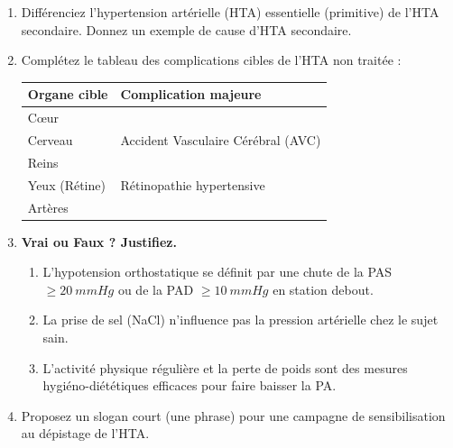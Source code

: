 \documentclass[11pt]{article}
\begin{document}
\begin{exercice}
\begin{enumerate}
\item Différenciez l'hypertension artérielle (HTA) essentielle (primitive) de l'HTA secondaire. Donnez un exemple de cause d'HTA secondaire.
\item Complétez le tableau des complications cibles de l'HTA non traitée :
\begin{center}
\begin{tabularx}{\linewidth}{|X|X|}
\hline
\textbf{Organe cible} & \textbf{Complication majeure} \\
\hline
Cœur & \\
\hline
Cerveau & Accident Vasculaire Cérébral (AVC) \\
\hline
Reins & \\
\hline
Yeux (Rétine) & Rétinopathie hypertensive \\
\hline
Artères & \\
\hline
\end{tabularx}
\end{center}
\item \textbf{Vrai ou Faux ? Justifiez.}
\begin{enumerate}
\item L'hypotension orthostatique se définit par une chute de la PAS $\ge \SI{20}{mmHg}$ ou de la PAD $\ge \SI{10}{mmHg}$ en station debout.
\item La prise de sel (NaCl) n'influence pas la pression artérielle chez le sujet sain.
\item L'activité physique régulière et la perte de poids sont des mesures hygiéno-diététiques efficaces pour faire baisser la PA.
\end{enumerate}
\item Proposez un slogan court (une phrase) pour une campagne de sensibilisation au dépistage de l'HTA.
\end{enumerate}
\end{exercice}
\end{document}
